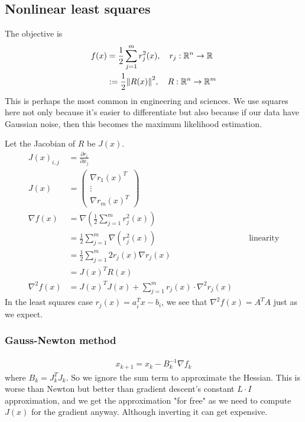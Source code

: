 \documentclass[class=article,crop=false]{standalone}
\begin{document}
\subsection{Nonlinear least squares}
The objective is
\begin{align*}
	f(x) &= \frac{1}{2} \sum_{ j= 1}^{ m} r_j^2 (x), \quad  r_j: \mathbb{R}^{n} \to \mathbb{R} \\
	     &:= \frac{1}{2} {\left\lVert{ R(x)}\right\rVert} ^2, \quad R: \mathbb{R}^{n} \to \mathbb{R}^{m} 
\end{align*}
This is perhaps the most common in engineering and sciences. We use squares here not only because it's easier to differentiate but also because if our data have Gaussian noise, then this becomes the maximum likelihood estimation.

Let the Jacobian of $ R$ be  $ J(x)$.
 \begin{align*}
	 J(x)_{i,j} &= \frac{\partial r_i}{\partial x_j}  \\
	 J(x) &= \begin{pmatrix} \nabla r_1(x)^{T}\\ \vdots\\ \nabla r_m(x)^{T} \end{pmatrix} \\
	 \nabla f(x) &= \nabla \left( \frac{1}{2} \sum_{ j= 1}^{ m} r_j^2(x) \right)  \\
		     &= \frac{1}{2} \sum_{ j= 1}^{ m} \nabla (r_j^2(x)) && \text{ linearity}  \\
		     &= \frac{1}{2} \sum_{ j= 1}^{ m} 2 r_j(x) \nabla r_j(x) \\
		     &= J(x)^{T} R(x) \\
	 \nabla ^2f(x) &= J(x)^{T}J(x) + \sum_{ j= 1}^{ m} r_j(x) \cdot  \nabla ^2 r_j(x)
\end{align*}
In the least squares case $ r_j(x) = a_i^{T} x -b_i$, we see that $ \nabla ^2f(x) = A^{T}A$ just as we expect.

\subsubsection{Gauss-Newton method}
\begin{align*}
	x_{k+1} = x_k - B_k^{-1} \nabla f_k
\end{align*}
where $ B_k = J_k^{T} J_k$. So we ignore the sum term to approximate the Hessian. This is worse than Newton but better than gradient descent's constant $ L \cdot I$ approximation, and we get the approximation "for free" as we need to compute $ J(x)$ for the gradient anyway. Although inverting it can get expensive.
\end{document}
